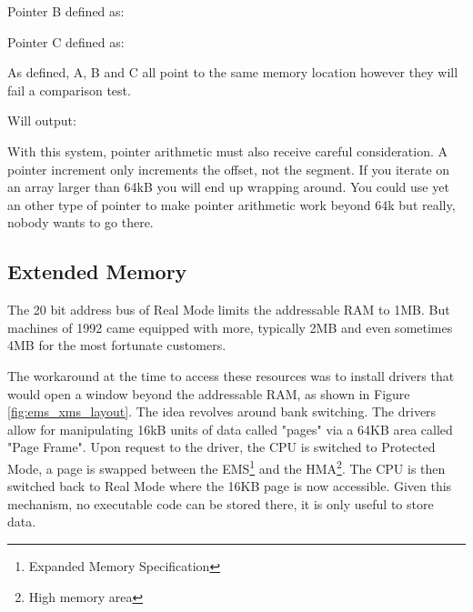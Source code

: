 \documentclass[book.tex]{subfiles}
\begin{document}
\bigskip

Pointer B defined as:\\
\par
\begin{minipage}{\textwidth}

\end{minipage}

\bigskip

Pointer C defined as:\\
\par
\begin{minipage}{\textwidth}

\end{minipage}

As defined, A, B and C all point to the same memory location however they will fail a comparison test.\\

\begin{minipage}{\textwidth}

\end{minipage}
\par
Will output:\\

\begin{minipage}{\textwidth}

\end{minipage}
\par

With this system, pointer arithmetic must also receive careful consideration. A  pointer increment only increments the offset, not the segment. If you iterate on an array larger than 64kB you will end up wrapping around. You could use yet an other type of pointer  to make pointer arithmetic work beyond 64k but really, nobody wants to go there.




  \subsection{Extended Memory}

The 20 bit address bus of Real Mode limits the addressable RAM to 1MB. But machines of 1992 came equipped with more, typically 2MB and even sometimes 4MB for the most fortunate customers.\\
\par 
The workaround at the time to access these resources was to install drivers that would open a window beyond the addressable RAM, as shown in Figure \ref{fig:ems_xms_layout}. The idea revolves around bank switching. The drivers allow for manipulating 16kB units of data called "pages" via a 64KB area called "Page Frame". Upon request to the driver, the CPU is switched to Protected Mode, a page is swapped between the EMS\footnote{Expanded Memory Specification} and the HMA\footnote{High memory area}. The CPU is then switched back to Real Mode where the 16KB page is now accessible. Given this mechanism, no executable code can be stored there, it is only useful to store data.
\end{document}
